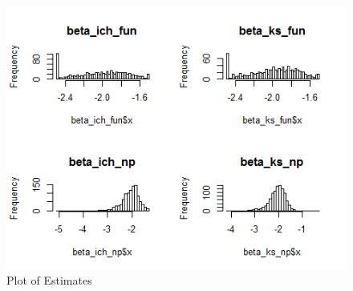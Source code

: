 \documentclass[11pt, a4paper, leqno]{article}
\begin{document}
\begin{figure}[h!]
  \caption{Plot of Estimates}
  \includegraphics[width=\linewidth]{comparison_np_fun_plot.png}
 
  \label{fig:plot of estimates}
\end{figure}
\end{document}

